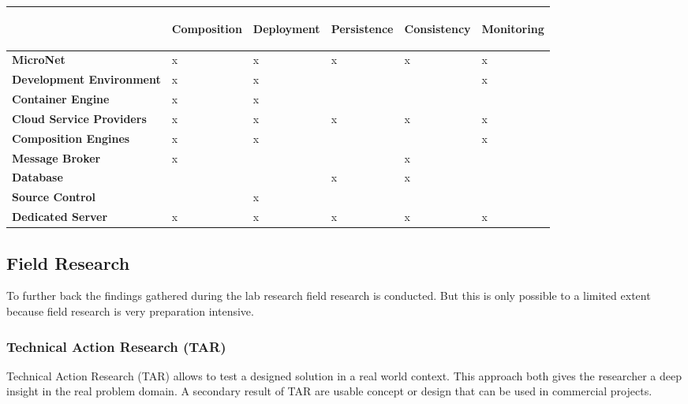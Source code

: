 \begin{center}
  \begin{tabular}{ l | l | l | l | l | l | }
    &\begin{turn}{90}\textbf{Composition}\end{turn}
    &\begin{turn}{90}\textbf{Deployment}\end{turn}
    &\begin{turn}{90}\textbf{Persistence}\end{turn}
    &\begin{turn}{90}\textbf{Consistency}\end{turn}
    &\begin{turn}{90}\textbf{Monitoring}\end{turn}
    \\\hline
    
    
    \textbf{MicroNet}&x&x&x&x&x\\\hline
    \textbf{Development Environment}&x&x&&&x\\\hline
    \textbf{Container Engine}&x&x&&&\\\hline
    \textbf{Cloud Service Providers}&x&x&x&x&x\\\hline
    \textbf{Composition Engines}&x&x&&&x\\\hline
    \textbf{Message Broker}&x&&&x&\\\hline
    \textbf{Database}&&&x&x&\\\hline
    \textbf{Source Control}&&x&&&\\\hline
    \textbf{Dedicated Server}&x&x&x&x&x\\\hline
  \end{tabular}
\end{center}

\subsection{Field Research}

To further back the findings gathered during the lab research field research is
conducted. But this is only possible to a limited extent because field research
is very preparation intensive. 

\subsubsection{Technical Action Research (TAR)}

Technical Action Research (TAR) allows to test a designed solution in a real
world context. This approach both gives the researcher a deep insight in the real
problem domain. A secondary result of TAR are usable concept or design that
can be used in commercial projects.

